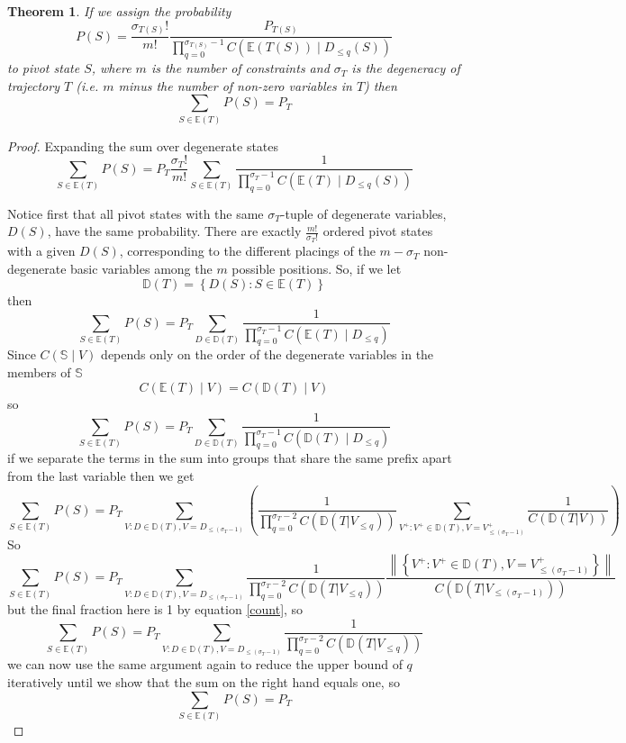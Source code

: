 \documentclass{article}
\newtheorem{theorem}{Theorem}
\begin{document}
\begin{theorem}
	If we assign the probability
	\begin{equation}
	P(S) =  \frac{\sigma_{T(S)}!}{m!} \frac{P_{T(S)}}{\prod_{q=0}^{\sigma_{T(S)}-1} C(\mathbb{E}(T(S)) \mid D_{\le q}(S))}
	\label{pivotProb}
	\end{equation}
	to pivot state $S$, where $m$ is the number of constraints and $\sigma_{T}$ is the degeneracy of trajectory $T$ (i.e. $m$ minus the number of non-zero variables in $T$) then
	\[
	\sum_{S \in \mathbb{E}(T)} P(S) = P_{T}
	\]
\end{theorem}
\begin{proof}
	Expanding the sum over degenerate states
	\[
	\sum_{S \in \mathbb{E}(T)} P(S) =
	P_T \frac{\sigma_T!}{m!} \sum_{S \in \mathbb{E}(T)} \frac{1}{\prod_{q=0}^{\sigma_T-1} C(\mathbb{E}(T) \mid D_{\le q}(S))}
	\]
	
	Notice first that all pivot states with the same $\sigma_T$-tuple of degenerate variables, $D(S)$, have the same probability. There are exactly $\frac{m!}{\sigma_T!}$ ordered pivot states with a given $D(S)$, corresponding to the different placings of the $m-\sigma_T$ non-degenerate basic variables among the $m$ possible positions. So, if we let
	\[
	\mathbb{D}(T) = \left\{ D(S) : S \in \mathbb{E}(T) \right\}
	\]
	then
	\[
	\sum_{S \in \mathbb{E}(T)} P(S) = P_T \sum_{D \in \mathbb{D}(T)} \frac{1}{\prod_{q=0}^{\sigma_T-1} C(\mathbb{E}(T) \mid D_{\le q})}
	\]
	Since $C(\mathbb{S} \mid V)$ depends only on the order of the degenerate variables in the members of $\mathbb{S}$
	\[
	C(\mathbb{E}(T) \mid V) = C(\mathbb{D}(T) \mid V)
	\]
	so
	\begin{equation}
	\sum_{S \in \mathbb{E}(T)} P(S) = P_T \sum_{D \in \mathbb{D}(T)} \frac{1}{\prod_{q=0}^{\sigma_T-1} C(\mathbb{D}(T) \mid D_{\le q})}
	\label{normalForm}
	\end{equation}
	if we separate the terms in the sum into groups that share the same prefix apart from the last variable then we get
	\[
	\sum_{S \in \mathbb{E}(T)} P(S) = 
	P_T \sum_{V : D \in \mathbb{D}(T), V = D_{\le (\sigma_T-1)}} 
	\left(
	\frac{1}{\prod_{q=0}^{\sigma_T-2} C(\mathbb{D}(T|V_{\le q}))}
	\sum_{V^+: V^+ \in \mathbb{D}(T), V = V^+_{\le (\sigma_T-1)}}
	\frac{1}{C(\mathbb{D}(T|V))}
	\right)
	\]
	So
	\[
	\sum_{S \in \mathbb{E}(T)} P(S) = 
	P_T \sum_{V : D \in \mathbb{D}(T), V = D_{\le (\sigma_T-1)}} 
	\frac{1}{\prod_{q=0}^{\sigma_T-2} C(\mathbb{D}(T|V_{\le q}))}
	\frac{\left\|\left\{V^+: V^+ \in \mathbb{D}(T), V = V^+_{\le (\sigma_T-1)}\right\}\right\|}{C(\mathbb{D}(T|V_{\le (\sigma_T-1)}))}
	\]
	but the final fraction here is 1 by equation \ref{count}, so
	\[
	\sum_{S \in \mathbb{E}(T)} P(S) = 
	P_T \sum_{V : D \in \mathbb{D}(T), V = D_{\le (\sigma_T-1)}} 
	\frac{1}{\prod_{q=0}^{\sigma_T-2} C(\mathbb{D}(T|V_{\le q}))}
	\]
	we can now use the same argument again to reduce the upper bound of $q$ iteratively until we show that the sum on the right hand equals one, so
	\[
	\sum_{S \in \mathbb{E}(T)} P(S) = P_T
	\]
\end{proof}
\end{document}
